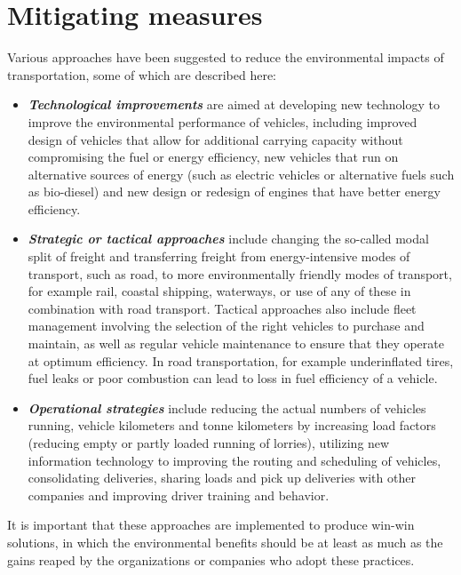 \section{Mitigating measures}
Various approaches have been suggested to reduce the environmental impacts of transportation, some of which are described here:
\begin{itemize}
	\item \textbf{\textit{Technological improvements}} are aimed at developing new technology to improve the environmental performance of vehicles, including improved design of vehicles that allow for additional carrying capacity without compromising the fuel or energy efficiency, new vehicles that run on alternative sources of energy (such as electric vehicles or alternative fuels such as bio-diesel) and new design or redesign of engines that have better energy efficiency.
	\item \textbf{\textit{Strategic or tactical approaches}} include changing the so-called modal split of freight and transferring freight from energy-intensive modes of transport, such as road, to more environmentally friendly modes of transport, for example rail, coastal shipping, waterways, or use of any of these in combination with road transport. Tactical approaches also include fleet management involving the selection of the right vehicles to purchase and maintain, as well as regular vehicle maintenance to ensure that they operate at optimum efficiency. In road transportation, for example underinflated tires, fuel leaks or poor combustion can lead to loss in fuel efficiency of a vehicle.
	\item \textbf{\textit{Operational strategies}} include reducing the actual numbers of vehicles running, vehicle kilometers and tonne kilometers by increasing load factors (reducing empty or partly loaded running of lorries), utilizing new information technology to improving the routing and scheduling of vehicles, consolidating deliveries, sharing loads and pick up deliveries with other companies and improving driver training and behavior.
\end{itemize}
It is important that these approaches are implemented to produce win-win solutions, in which the environmental benefits should be at least as much as the gains reaped by the organizations or companies who adopt these practices.
